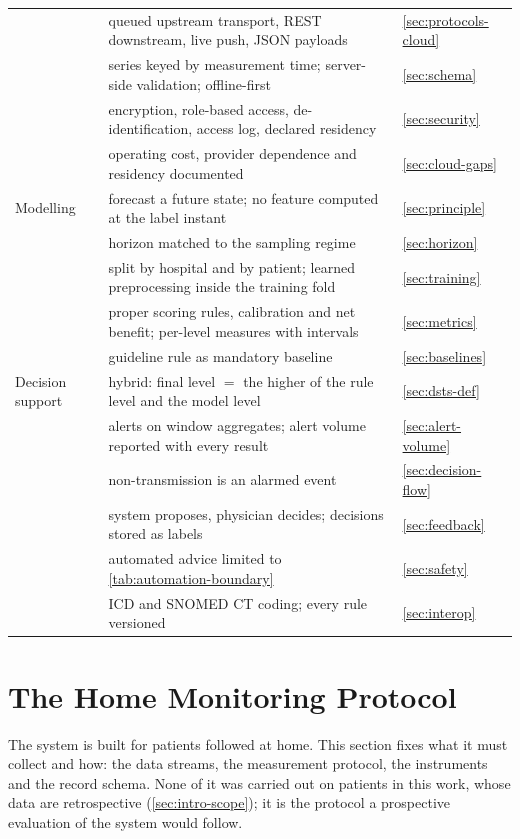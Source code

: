 \begin{table}[htbp]
\begin{tabularx}{\textwidth}{@{}>{\raggedright\arraybackslash}p{2.2cm} X >{\raggedright\arraybackslash}p{3.5cm}@{}}
 & queued upstream transport, REST downstream, live push, JSON payloads & \cref{sec:protocols-cloud} \\
 & series keyed by measurement time; server-side validation; offline-first & \cref{sec:schema} \\
 & encryption, role-based access, de-identification, access log, declared residency & \cref{sec:security} \\
 & operating cost, provider dependence and residency documented & \cref{sec:cloud-gaps} \\
\addlinespace
Modelling & forecast a future state; no feature computed at the label instant & \cref{sec:principle} \\
 & horizon matched to the sampling regime & \cref{sec:horizon} \\
 & split by hospital and by patient; learned preprocessing inside the training fold & \cref{sec:training} \\
 & proper scoring rules, calibration and net benefit; per-level measures with intervals & \cref{sec:metrics} \\
 & guideline rule as mandatory baseline & \cref{sec:baselines} \\
\addlinespace
Decision support & hybrid: final level $=$ the higher of the rule level and the model level & \cref{sec:dsts-def} \\
 & alerts on window aggregates; alert volume reported with every result & \cref{sec:alert-volume} \\
 & non-transmission is an alarmed event & \cref{sec:decision-flow} \\
 & system proposes, physician decides; decisions stored as labels & \cref{sec:feedback} \\
 & automated advice limited to \cref{tab:automation-boundary} & \cref{sec:safety} \\
 & ICD and SNOMED CT coding; every rule versioned & \cref{sec:interop} \\
\bottomrule
\end{tabularx}
\end{table}

\section{The Home Monitoring Protocol}\label{sec:home-protocol}

The system is built for patients followed at home. This section fixes what it must collect and how: the data streams, the measurement protocol, the instruments and the record schema. None of it was carried out on patients in this work, whose data are retrospective (\cref{sec:intro-scope}); it is the protocol a prospective evaluation of the system would follow.

